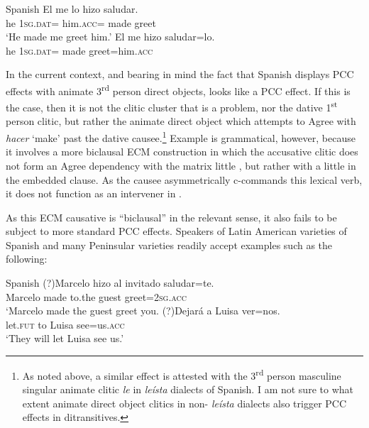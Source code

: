 \documentclass[output=paper,colorlinks,citecolor=brown,nonflat]{langsci/langscibook}
\begin{document}
\ea%
    \label{ex:sheehan:33}
    Spanish \citep[463]{Torrego2010}
    \ea\label{ex:sheehan:33a}
    \gll    *El   me     lo     hizo   saludar.\\
            he   \textsc{1sg}.\textsc{dat}=  him.\textsc{acc}=  made greet\\
    \glt    ‘He made me greet him.’
    \ex\label{ex:sheehan:33b}
    \gll    El   me     hizo   saludar=lo.\\
            he   \textsc{1sg}.\textsc{dat=}  made   greet=him.\textsc{acc}\\
    \z
\z

In the current context, and bearing in mind the fact that Spanish displays PCC effects with animate 3\textsuperscript{rd} person direct objects,  looks like a PCC effect. If this is the case, then it is not the clitic cluster that is a problem, nor the dative 1\textsuperscript{st} person clitic, but rather the animate direct object which attempts to Agree with \textit{hacer} ‘make’ past the dative causee.\footnote{As noted above, a similar effect is attested with the 3\textsuperscript{rd} person masculine singular animate clitic \textit{le} in \textit{leísta} dialects of Spanish. I am not sure to what extent animate direct object clitics in non- \textit{leísta} dialects also trigger PCC effects in ditransitives.  } Example  is grammatical, however, because it involves a more biclausal ECM construction in which the accusative clitic does not form an Agree dependency with the matrix little {\liv}, but rather with a little {\liv} in the embedded clause. As the causee asymmetrically c-commands this lexical verb, it does not function as an intervener in .

\newpage
As this ECM causative is ``biclausal'' in the relevant sense, it also fails to be subject to more standard PCC effects. Speakers of Latin American varieties of Spanish and many Peninsular varieties readily accept examples such as the following:

\ea%
    \label{ex:sheehan:34}
    Spanish
    \ea\label{ex:sheehan:34a}
    \gll    (?)Marcelo   hizo   al   invitado  saludar=te.\\
            Marcelo   made  to.the guest greet=\textsc{2sg}.\textsc{acc}\\
    \glt    `Marcelo made the guest greet you.
    \ex\label{ex:sheehan:34b}
    \gll    (?)Dejará   a   Luisa   ver=nos.\\
            let.\textsc{fut}   to   Luisa   see=us.\textsc{acc}\\
    \glt    ‘They will let Luisa see us.’
    \z
\z
\end{document}
